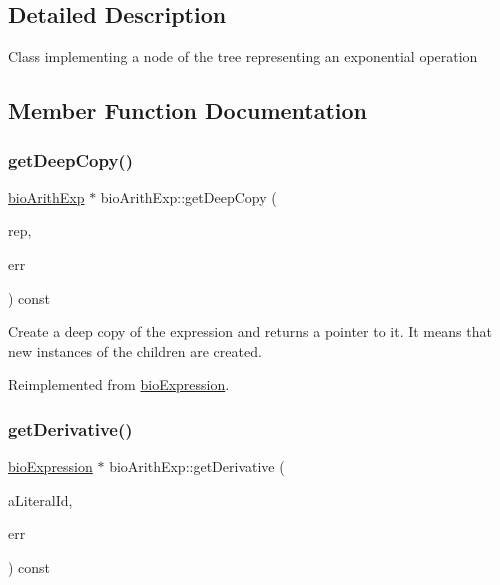 \subsection{Detailed Description}
Class implementing a node of the tree representing an exponential operation 

\subsection{Member Function Documentation}
\mbox{\label{classbio_arith_exp_aec1900d14fe80411c3322358773c7ac6}} 
\subsubsection{\texorpdfstring{get\+Deep\+Copy()}{getDeepCopy()}}
{\footnotesize\ttfamily \hyperlink{classbio_arith_exp}{bio\+Arith\+Exp} $\ast$ bio\+Arith\+Exp\+::get\+Deep\+Copy (\begin{DoxyParamCaption}\item[{\hyperlink{classbio_expression_repository}{bio\+Expression\+Repository} $\ast$}]{rep,  }\item[{pat\+Error $\ast$\&}]{err }\end{DoxyParamCaption}) const\hspace{0.3cm}{\ttfamily [virtual]}}

Create a deep copy of the expression and returns a pointer to it. It means that new instances of the children are created. 

Reimplemented from \hyperlink{classbio_expression_a4ee1b8add634078a02eaae26cd40dcc8}{bio\+Expression}.

\mbox{\label{classbio_arith_exp_ae6fb9aa47399f18af66cb4250b36f707}} 
\subsubsection{\texorpdfstring{get\+Derivative()}{getDerivative()}}
{\footnotesize\ttfamily \hyperlink{classbio_expression}{bio\+Expression} $\ast$ bio\+Arith\+Exp\+::get\+Derivative (\begin{DoxyParamCaption}\item[{pat\+U\+Long}]{a\+Literal\+Id,  }\item[{pat\+Error $\ast$\&}]{err }\end{DoxyParamCaption}) const\hspace{0.3cm}{\ttfamily [virtual]}}

